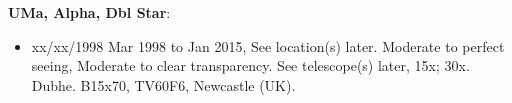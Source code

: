 {\bf UMa, Alpha, Dbl Star}:
\begin{itemize}
\item xx/xx/1998 Mar 1998 to Jan 2015, See location(s) later. Moderate to perfect seeing, Moderate to clear transparency. See telescope(s) later, 15x; 30x. Dubhe. B15x70, TV60F6, Newcastle (UK).
\end{itemize}
